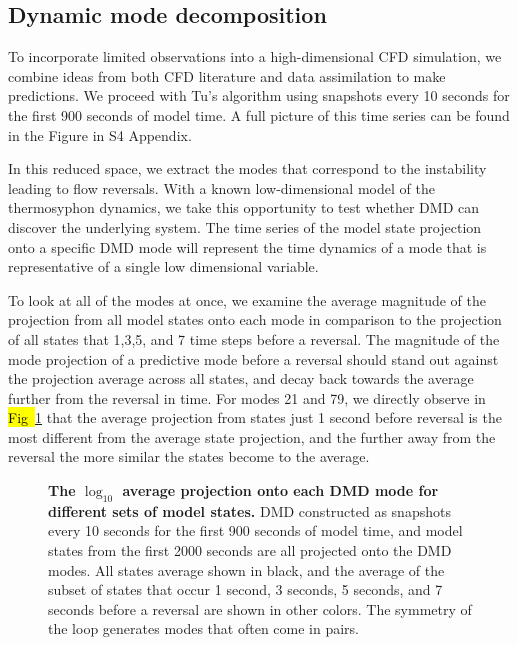 \documentclass[10pt,letterpaper]{article}
\begin{document}
\subsection*{Dynamic mode decomposition}
\label{dmd_section}

To incorporate limited observations into a high-dimensional CFD simulation, we combine ideas from both CFD literature and data assimilation to make predictions.
We proceed with Tu's algorithm using snapshots every 10 seconds for the first 900 seconds of model time.
A full picture of this time series can be found in the Figure in S4 Appendix.

In this reduced space, we extract the modes that correspond to the instability leading to flow reversals.
With a known low-dimensional model of the thermosyphon dynamics, we take this opportunity to test whether DMD can discover the underlying system.
The time series of the model state projection onto a specific DMD mode will represent the time dynamics of a mode that is representative of a single low dimensional variable.

To look at all of the modes at once, we examine the average magnitude of the projection from all model states onto each mode in comparison to the projection of all states that 1,3,5, and 7 time steps before a reversal.
The magnitude of the mode projection of a predictive mode before a reversal should stand out against the projection average across all states, and decay back towards the average further from the reversal in time.
For modes 21 and 79, we directly observe in \hl{Fig~}\ref{fig:DMD_modes} that the average projection from states just 1 second before reversal is the most different from the average state projection, and the further away from the reversal the more similar the states become to the average.

\begin{figure}[h]
  \centering
  \caption[]{
\textbf{    The $\log_{10}$ average projection onto each DMD mode for different sets of model states.
}    DMD constructed as snapshots every 10 seconds for the first 900 seconds of model time, and model states from the first 2000 seconds are all projected onto the DMD modes.
    All states average shown in black, and the average of the subset of states that occur 1 second, 3 seconds, 5 seconds, and 7 seconds before a reversal are shown in other colors.
    The symmetry of the loop generates modes that often come in pairs.
      }
  \label{fig:DMD_modes}
\end{figure}
\end{document}
